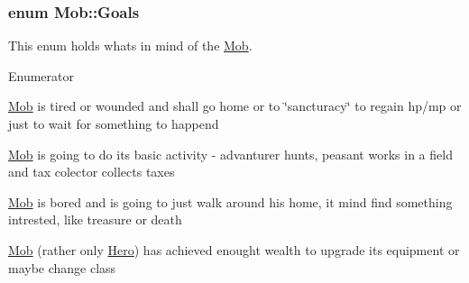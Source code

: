 \subsubsection[{\texorpdfstring{Goals}{Goals}}]{\setlength{\rightskip}{0pt plus 5cm}enum {\bf Mob\+::\+Goals}\hspace{0.3cm}{\ttfamily [protected]}}\hypertarget{class_mob_a886346a9f913203df0797f2c84dd8962}{}\label{class_mob_a886346a9f913203df0797f2c84dd8962}
This enum holds what\textquotesingle{}s in mind of the \hyperlink{class_mob}{Mob}. \begin{Desc}
\item[Enumerator]\par
\begin{description}
\item[{\em 
rest\hypertarget{class_mob_a886346a9f913203df0797f2c84dd8962a3d18c0a90658cc4872eed0afe28790b4}{}\label{class_mob_a886346a9f913203df0797f2c84dd8962a3d18c0a90658cc4872eed0afe28790b4}
}]\hyperlink{class_mob}{Mob} is tired or wounded and shall go home or to \char`\"{}sancturacy\char`\"{} to regain hp/mp or just to wait for something to happend \item[{\em 
grind\hypertarget{class_mob_a886346a9f913203df0797f2c84dd8962aa72b321b37507255070e236e133616f9}{}\label{class_mob_a886346a9f913203df0797f2c84dd8962aa72b321b37507255070e236e133616f9}
}]\hyperlink{class_mob}{Mob} is going to do it\textquotesingle{}s basic activity -\/ advanturer hunts, peasant works in a field and tax colector collects taxes \item[{\em 
explore\hypertarget{class_mob_a886346a9f913203df0797f2c84dd8962a114d85e85d882dd8bf2be34208450b6c}{}\label{class_mob_a886346a9f913203df0797f2c84dd8962a114d85e85d882dd8bf2be34208450b6c}
}]\hyperlink{class_mob}{Mob} is bored and is going to just walk around his home, it mind find something intrested, like treasure or death \item[{\em 
upgrade\hypertarget{class_mob_a886346a9f913203df0797f2c84dd8962ac9be3f62a039d2a4c5a63146a03a307d}{}\label{class_mob_a886346a9f913203df0797f2c84dd8962ac9be3f62a039d2a4c5a63146a03a307d}
}]\hyperlink{class_mob}{Mob} (rather only \hyperlink{class_hero}{Hero}) has achieved enought wealth to upgrade it\textquotesingle{}s equipment or maybe change class \end{description}
\end{Desc}


